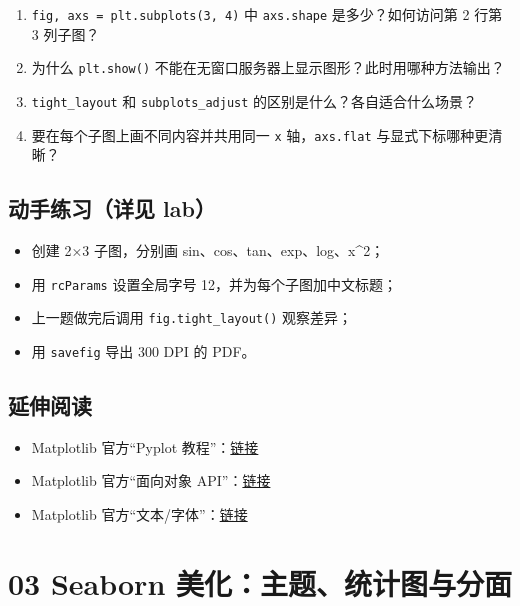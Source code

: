 \begin{enumerate}
\def\labelenumi{\arabic{enumi}.}
\tightlist
\item
  \texttt{fig,\ axs\ =\ plt.subplots(3,\ 4)} 中 \texttt{axs.shape}
  是多少？如何访问第 2 行第 3 列子图？
\item
  为什么 \texttt{plt.show()}
  不能在无窗口服务器上显示图形？此时用哪种方法输出？
\item
  \texttt{tight\_layout} 和 \texttt{subplots\_adjust}
  的区别是什么？各自适合什么场景？
\item
  要在每个子图上画不同内容并共用同一 \texttt{x} 轴，\texttt{axs.flat}
  与显式下标哪种更清晰？
\end{enumerate}

\subsection{动手练习（详见
lab）}\label{ux52a8ux624bux7ec3ux4e60ux8be6ux89c1-lab-9}

\begin{itemize}
\tightlist
\item
  创建 2×3 子图，分别画 sin、cos、tan、exp、log、x\^{}2；
\item
  用 \texttt{rcParams} 设置全局字号 12，并为每个子图加中文标题；
\item
  上一题做完后调用 \texttt{fig.tight\_layout()} 观察差异；
\item
  用 \texttt{savefig} 导出 300 DPI 的 PDF。
\end{itemize}

\subsection{延伸阅读}\label{ux5ef6ux4f38ux9605ux8bfb-22}

\begin{itemize}
\tightlist
\item
  Matplotlib 官方``Pyplot
  教程''：\href{https://matplotlib.org/stable/tutorials/pyplot.html}{链接}
\item
  Matplotlib 官方``面向对象
  API''：\href{https://matplotlib.org/stable/tutorials/introductory/usage.html\#the-object-oriented-interface}{链接}
\item
  Matplotlib
  官方``文本/字体''：\href{https://matplotlib.org/stable/users/explain/text/text_props.html}{链接}
\end{itemize}

\section{03 Seaborn
美化：主题、统计图与分面}\label{seaborn-ux7f8eux5316ux4e3bux9898ux7edfux8ba1ux56feux4e0eux5206ux9762}

